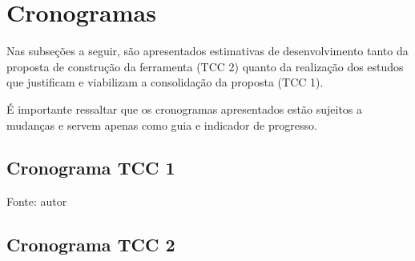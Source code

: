  
\chapter{Cronogramas}
Nas subseções a seguir, são apresentados estimativas de desenvolvimento tanto da proposta de construção da ferramenta (TCC 2) quanto da 
realização dos estudos que justificam e viabilizam a consolidação da proposta (TCC 1). 

É importante ressaltar que os cronogramas apresentados estão sujeitos a mudanças e servem apenas como guia e indicador de progresso.

\section{Cronograma TCC 1}


\begin{table}[h]
	\centering
	\caption{Cronograma TCC 1.}
	\label{perfil}
	Fonte: autor
\end{table}


\section{Cronograma TCC 2}


